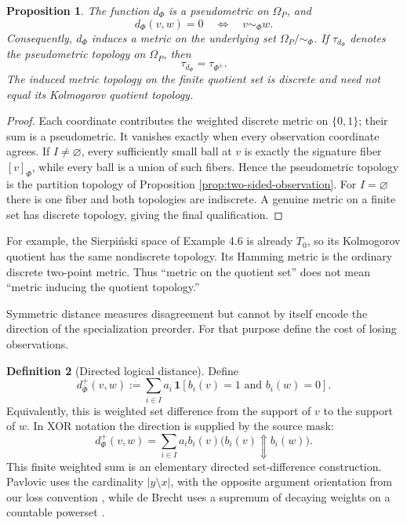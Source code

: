 \documentclass[11pt]{article}
\theoremstyle{definition}
\newtheorem{definition}{Definition}[section]
\theoremstyle{plain}
\newtheorem{proposition}[definition]{Proposition}
\theoremstyle{remark}
\newcommand{\ind}{\mathbf 1}
\begin{document}
\begin{proposition}
The function $d_\Phi$ is a pseudometric on $\Omega_P$, and
\[
 d_\Phi(v,w)=0
 \quad\Longleftrightarrow\quad
 v\sim_\Phi w.
\]
Consequently, $d_\Phi$ induces a metric on the underlying set
$\Omega_P/{\sim_\Phi}$.  If $\tau_{d_\Phi}$ denotes the pseudometric topology on
$\Omega_P$, then
\[
 \tau_{d_\Phi}=\tau_{\Phi^{\pm}}.
\]
The induced metric topology on the finite quotient set is discrete and need not
equal its Kolmogorov quotient topology.
\end{proposition}

\begin{proof}
Each coordinate contributes the weighted discrete metric on $\{0,1\}$; their
sum is a pseudometric.  It vanishes exactly when every observation coordinate
agrees.  If $I\neq\varnothing$, every sufficiently small ball at $v$ is exactly the signature
fiber $[v]_\Phi$, while every ball is a union of such fibers.  Hence the
pseudometric topology is the partition topology of Proposition
\ref{prop:two-sided-observation}.  For $I=\varnothing$ there is one fiber and both
topologies are indiscrete.  A genuine metric on a finite set has discrete
topology, giving the final qualification.
\end{proof}

For example, the Sierpi\'nski space of Example 4.6 is already $T_0$, so its
Kolmogorov quotient has the same nondiscrete topology.  Its Hamming metric is
the ordinary discrete two-point metric.  Thus ``metric on the quotient set''
does not mean ``metric inducing the quotient topology.''

Symmetric distance measures disagreement but cannot by itself encode the
direction of the specialization preorder.  For that purpose define the cost of
losing observations.

\begin{definition}[Directed logical distance]
Define
\[
 d_\Phi^+(v,w)
 :=\sum_{i\in I} a_i\,
   \ind[b_i(v)=1\text{ and }b_i(w)=0].
\]
Equivalently, this is weighted set difference from the support of $v$ to the
support of $w$.  In XOR notation the direction is supplied by the source mask:
\[
 d_\Phi^+(v,w)=\sum_{i\in I} a_i b_i(v)
   \bigl(b_i(v)\Updownarrow b_i(w)\bigr).
\]
This finite weighted sum is an elementary directed set-difference construction.
Pavlovic uses the cardinality $\lvert y\setminus x\rvert$, with the opposite
argument orientation from our loss convention \cite[Sec.~2]{Pavlovic2012},
while de Brecht uses a supremum of decaying weights on a countable powerset
\cite[Sec.~4]{deBrecht2013}.
\end{definition}
\end{document}
